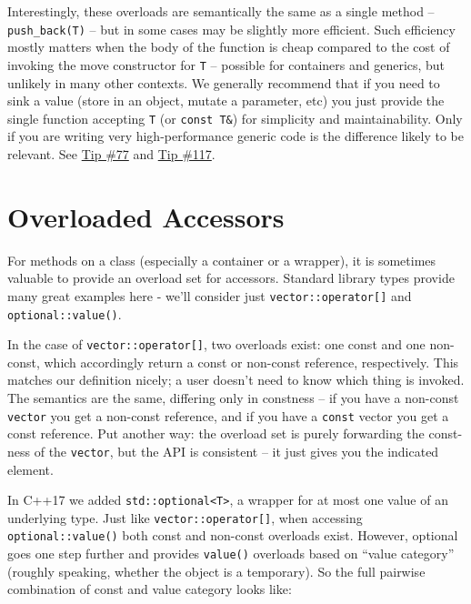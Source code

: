 Interestingly, these overloads are semantically the same as a single method – \texttt{push_back(T)} – but in some cases may be slightly more efficient. Such efficiency mostly matters when the body of the function is cheap compared to the cost of invoking the move constructor for \texttt{T} – possible for containers and generics, but unlikely in many other contexts. We generally recommend that if you need to sink a value (store in an object, mutate a parameter, etc) you just provide the single function accepting \texttt{T} (or \texttt{const T&}) for simplicity and maintainability. Only if you are writing very high-performance generic code is the difference likely to be relevant. See \hyperref[ch:tip-of-the-week-77]{Tip \#77} and \hyperref[ch:tip-of-the-week-117]{Tip \#117}.

\section{Overloaded Accessors}
For methods on a class (especially a container or a wrapper), it is sometimes valuable to provide an overload set for accessors. Standard library types provide many great examples here - we’ll consider just \texttt{vector::operator[]} and \texttt{optional::value()}.

In the case of \texttt{vector::operator[]}, two overloads exist: one const and one non-const, which accordingly return a const or non-const reference, respectively. This matches our definition nicely; a user doesn’t need to know which thing is invoked. The semantics are the same, differing only in constness – if you have a non-const \texttt{vector} you get a non-const reference, and if you have a \texttt{const} vector you get a const reference. Put another way: the overload set is purely forwarding the const-ness of the \texttt{vector}, but the API is consistent – it just gives you the indicated element.

In C++17 we added \texttt{std::optional<T>}, a wrapper for at most one value of an underlying type. Just like \texttt{vector::operator[]}, when accessing \texttt{optional::value()} both const and non-const overloads exist. However, optional goes one step further and provides \texttt{value()} overloads based on \enquote{value category} (roughly speaking, whether the object is a temporary). So the full pairwise combination of const and value category looks like:

